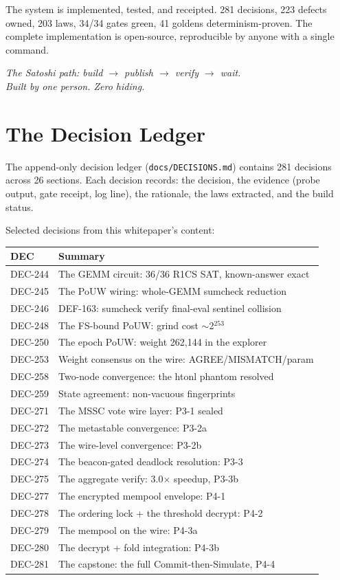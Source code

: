 \documentclass[11pt, a4paper]{article}
\begin{document}
The system is implemented, tested, and receipted. 281 decisions, 223 defects owned, 203 laws, 34/34 gates green, 41 goldens determinism-proven. The complete implementation is open-source, reproducible by anyone with a single command.

\begin{center}
\textit{The Satoshi path: build $\to$ publish $\to$ verify $\to$ wait.}\\[0.5em]
\textit{Built by one person. Zero hiding.}
\end{center}

\appendix
\section{The Decision Ledger}

The append-only decision ledger (\texttt{docs/DECISIONS.md}) contains 281 decisions across 26 sections. Each decision records: the decision, the evidence (probe output, gate receipt, log line), the rationale, the laws extracted, and the build status.

Selected decisions from this whitepaper's content:

\begin{longtable}{l p{11cm}}
\toprule
\textbf{DEC} & \textbf{Summary} \\
\midrule
\endhead
DEC-244 & The GEMM circuit: 36/36 R1CS SAT, known-answer exact \\
DEC-245 & The PoUW wiring: whole-GEMM sumcheck reduction \\
DEC-246 & DEF-163: sumcheck verify final-eval sentinel collision \\
DEC-248 & The FS-bound PoUW: grind cost $\sim$2$^{253}$ \\
DEC-250 & The epoch PoUW: weight 262{,}144 in the explorer \\
DEC-253 & Weight consensus on the wire: AGREE/MISMATCH/param \\
DEC-258 & Two-node convergence: the htonl phantom resolved \\
DEC-259 & State agreement: non-vacuous fingerprints \\
DEC-271 & The MSSC vote wire layer: P3-1 sealed \\
DEC-272 & The metastable convergence: P3-2a \\
DEC-273 & The wire-level convergence: P3-2b \\
DEC-274 & The beacon-gated deadlock resolution: P3-3 \\
DEC-275 & The aggregate verify: 3.0$\times$ speedup, P3-3b \\
DEC-277 & The encrypted mempool envelope: P4-1 \\
DEC-278 & The ordering lock + the threshold decrypt: P4-2 \\
DEC-279 & The mempool on the wire: P4-3a \\
DEC-280 & The decrypt + fold integration: P4-3b \\
DEC-281 & The capstone: the full Commit-then-Simulate, P4-4 \\
\bottomrule
\end{longtable}
\end{document}
